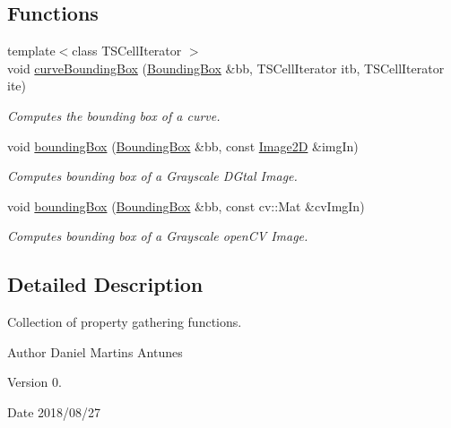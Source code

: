 \subsection*{Functions}
\begin{DoxyCompactItemize}
\item 
{\footnotesize template$<$class T\+S\+Cell\+Iterator $>$ }\\void \hyperlink{namespaceDIPaCUS_1_1Properties_a3d38c4947ecda62e133502ef919d76a0}{curve\+Bounding\+Box} (\hyperlink{structDIPaCUS_1_1Properties_1_1BoundingBox}{Bounding\+Box} \&bb, T\+S\+Cell\+Iterator itb, T\+S\+Cell\+Iterator ite)
\begin{DoxyCompactList}\small\item\em Computes the bounding box of a curve. \end{DoxyCompactList}\item 
void \hyperlink{namespaceDIPaCUS_1_1Properties_a17d4f21d5117ab744ee1b17f36dd8878}{bounding\+Box} (\hyperlink{structDIPaCUS_1_1Properties_1_1BoundingBox}{Bounding\+Box} \&bb, const \hyperlink{namespaceDIPaCUS_1_1Properties_aa6a61f89ec9c6c464ab0c0755f92e7fc}{Image2D} \&img\+In)
\begin{DoxyCompactList}\small\item\em Computes bounding box of a Grayscale D\+Gtal Image. \end{DoxyCompactList}\item 
void \hyperlink{namespaceDIPaCUS_1_1Properties_ad677c27627b57987a2957d3c378d7415}{bounding\+Box} (\hyperlink{structDIPaCUS_1_1Properties_1_1BoundingBox}{Bounding\+Box} \&bb, const cv\+::\+Mat \&cv\+Img\+In)
\begin{DoxyCompactList}\small\item\em Computes bounding box of a Grayscale open\+CV Image. \end{DoxyCompactList}\end{DoxyCompactItemize}


\subsection{Detailed Description}
Collection of property gathering functions. 

\begin{DoxyAuthor}{Author}
Daniel Martins Antunes 
\end{DoxyAuthor}
\begin{DoxyVersion}{Version}
0. 
\end{DoxyVersion}
\begin{DoxyDate}{Date}
2018/08/27 
\end{DoxyDate}


